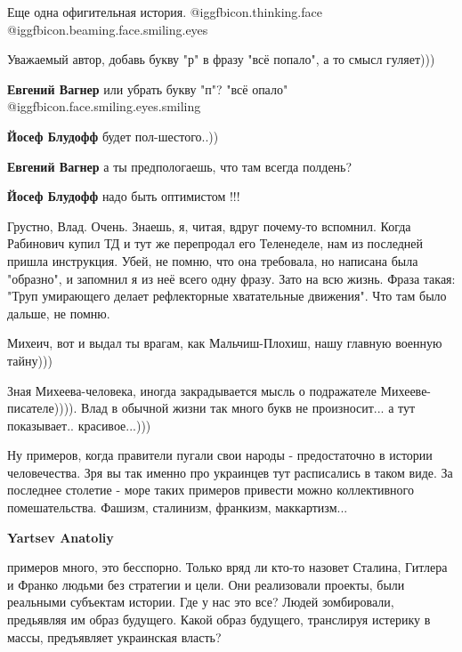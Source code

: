 \begin{itemize}
Еще одна офигительная история.  @igg{fbicon.thinking.face}  @igg{fbicon.beaming.face.smiling.eyes} 

Уважаемый автор, добавь букву "р" в фразу "всё попало", а то смысл гуляет)))

\begin{itemize} %
\textbf{Евгений Вагнер} или убрать букву "п"? "всё опало"  @igg{fbicon.face.smiling.eyes.smiling} 

\textbf{Йосеф Блудофф} будет пол-шестого..))

\textbf{Евгений Вагнер} а ты предпологаешь, что там всегда полдень?

\textbf{Йосеф Блудофф} надо быть оптимистом !!!
\end{itemize} %


Грустно, Влад. Очень. Знаешь, я, читая, вдруг почему-то вспомнил. Когда
Рабинович купил ТД и тут же перепродал его Теленеделе, нам из последней пришла
инструкция. Убей, не помню, что она требовала, но написана была "образно", и
запомнил я из неё всего одну фразу. Зато на всю жизнь. Фраза такая: "Труп
умирающего делает рефлекторные хватательные движения". Что там было дальше, не
помню.


Михеич, вот и выдал ты врагам, как Мальчиш-Плохиш, нашу главную военную тайну)))


Зная Михеева-человека, иногда закрадывается мысль о подражателе
Михееве-писателе)))). Влад в обычной жизни так много букв не произносит... а
тут показывает.. красивое...)))


Ну примеров, когда правители пугали свои народы - предостаточно в истории
человечества. Зря вы так именно про украинцев тут расписались в таком виде. За
последнее столетие - море таких примеров привести можно коллективного
помешательства. Фашизм, сталинизм, франкизм, маккартизм...

\begin{itemize} %
\textbf{Yartsev Anatoliy} 

примеров много, это бесспорно. Только вряд ли кто-то назовет Сталина, Гитлера и
Франко людьми без стратегии и цели. Они реализовали проекты, были реальными
субъектам истории. Где у нас это все? Людей зомбировали, предьявляя им образ
будущего. Какой образ будущего, транслируя истерику в массы, предъявляет
украинская власть?


\end{itemize}
\end{itemize}
